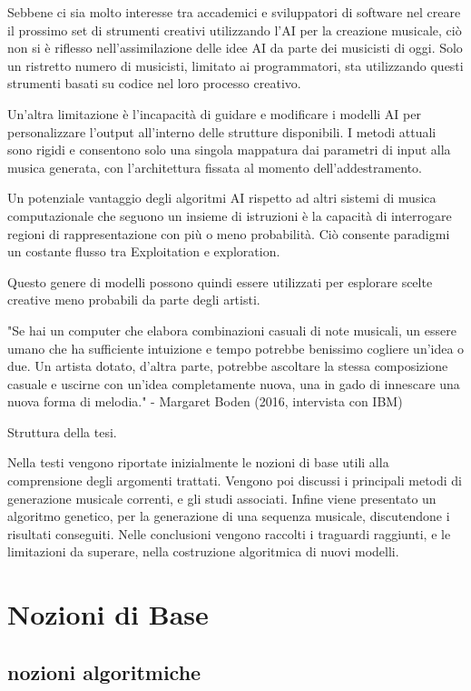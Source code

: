 \documentclass[a4paper,12pt]{report}
\begin{document}
Sebbene ci sia molto interesse tra accademici e sviluppatori di software nel creare il prossimo set di strumenti creativi utilizzando l'AI per la creazione musicale, 
ciò non si è riflesso nell'assimilazione delle idee AI da parte dei musicisti di oggi. 
Solo un ristretto numero di musicisti, limitato ai programmatori, sta utilizzando questi strumenti basati su codice nel loro processo creativo.

Un'altra limitazione è l'incapacità di guidare e modificare i modelli AI per personalizzare l'output all'interno delle strutture disponibili. 
I metodi attuali sono rigidi e consentono solo una singola mappatura dai parametri di input alla musica generata, con l'architettura fissata al momento dell'addestramento. 

Un potenziale vantaggio degli algoritmi AI rispetto ad altri sistemi di musica computazionale che seguono un insieme di istruzioni è la capacità di interrogare regioni di rappresentazione con più o meno probabilità. 
Ciò consente paradigmi un costante flusso tra Exploitation e exploration. 

Questo genere di modelli possono quindi essere utilizzati per esplorare scelte creative meno probabili da parte degli artisti.

"Se hai un computer che elabora combinazioni casuali di note musicali, un essere umano che ha sufficiente intuizione e tempo potrebbe benissimo cogliere un'idea o due. 
Un artista dotato, d'altra parte, potrebbe ascoltare la stessa composizione casuale e uscirne con un'idea completamente nuova, una in gado di innescare una nuova forma di melodia."
- Margaret Boden (2016, intervista con IBM)

Struttura della tesi.

Nella testi vengono riportate inizialmente le nozioni di base utili alla comprensione degli argomenti trattati.
Vengono poi discussi i principali metodi di generazione musicale correnti, e gli studi associati.
Infine viene presentato un algoritmo genetico, per la generazione di una sequenza musicale, discutendone i risultati conseguiti.
Nelle conclusioni vengono raccolti i traguardi raggiunti, e le limitazioni da superare, nella costruzione algoritmica di nuovi modelli.

\chapter{Nozioni di Base}

\section{nozioni algoritmiche}
\end{document}
